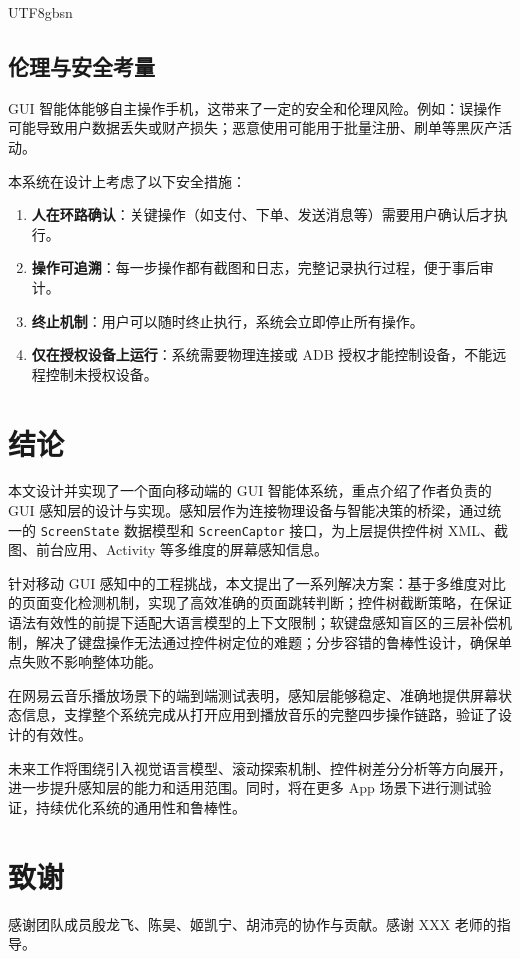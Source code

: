 \documentclass{article}
\begin{document}
\begin{CJK}{UTF8}{gbsn}
\subsection{伦理与安全考量}

GUI 智能体能够自主操作手机，这带来了一定的安全和伦理风险。例如：误操作可能导致用户数据丢失或财产损失；恶意使用可能用于批量注册、刷单等黑灰产活动。

本系统在设计上考虑了以下安全措施：

\begin{enumerate}[leftmargin=1.5em]
  \item \textbf{人在环路确认}：关键操作（如支付、下单、发送消息等）需要用户确认后才执行。
  \item \textbf{操作可追溯}：每一步操作都有截图和日志，完整记录执行过程，便于事后审计。
  \item \textbf{终止机制}：用户可以随时终止执行，系统会立即停止所有操作。
  \item \textbf{仅在授权设备上运行}：系统需要物理连接或 ADB 授权才能控制设备，不能远程控制未授权设备。
\end{enumerate}

\section{结论}
\label{sec:conclusion}

本文设计并实现了一个面向移动端的 GUI 智能体系统，重点介绍了作者负责的 GUI 感知层的设计与实现。感知层作为连接物理设备与智能决策的桥梁，通过统一的 \texttt{ScreenState} 数据模型和 \texttt{ScreenCaptor} 接口，为上层提供控件树 XML、截图、前台应用、Activity 等多维度的屏幕感知信息。

针对移动 GUI 感知中的工程挑战，本文提出了一系列解决方案：基于多维度对比的页面变化检测机制，实现了高效准确的页面跳转判断；控件树截断策略，在保证语法有效性的前提下适配大语言模型的上下文限制；软键盘感知盲区的三层补偿机制，解决了键盘操作无法通过控件树定位的难题；分步容错的鲁棒性设计，确保单点失败不影响整体功能。

在网易云音乐播放场景下的端到端测试表明，感知层能够稳定、准确地提供屏幕状态信息，支撑整个系统完成从打开应用到播放音乐的完整四步操作链路，验证了设计的有效性。

未来工作将围绕引入视觉语言模型、滚动探索机制、控件树差分分析等方向展开，进一步提升感知层的能力和适用范围。同时，将在更多 App 场景下进行测试验证，持续优化系统的通用性和鲁棒性。

\section*{致谢}
感谢团队成员殷龙飞、陈昊、姬凯宁、胡沛亮的协作与贡献。感谢 XXX 老师的指导。


\end{CJK}
\end{document}
